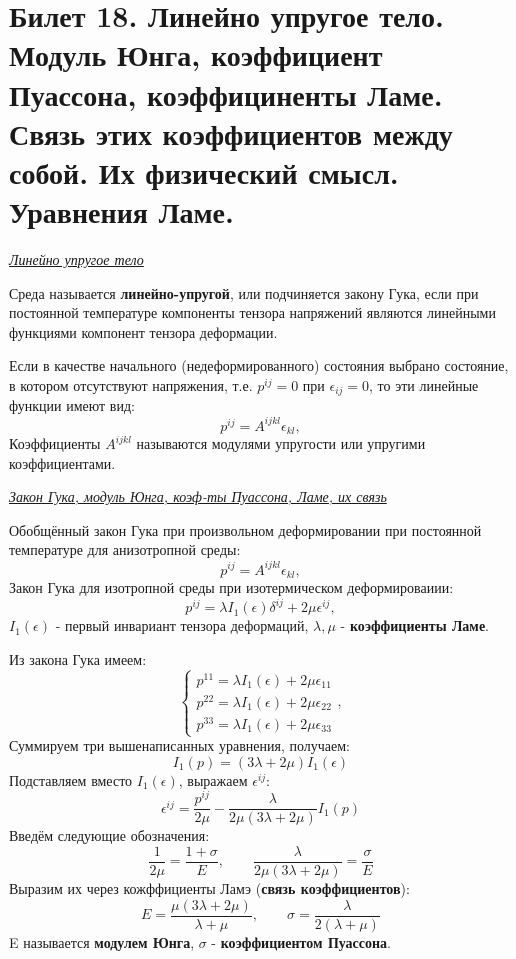 \newpage
\section{Билет 18. Линейно упругое тело. Модуль Юнга, коэффициент Пуассона, коэффициненты Ламе. Связь этих коэффициентов между собой. Их физический смысл. Уравнения Ламе.}

\begin{center}
  \textit{\underline{Линейно упругое тело}}
\end{center}
\quad[Э-137]Среда называется \textbf{линейно-упругой}, или подчиняется закону Гука, если при постоянной температуре компоненты тензора напряжений являются линейными функциями компонент тензора деформации.

\quad Если в качестве начального (недеформированного) состояния выбрано состояние, в котором отсутствуют напряжения, т.е. $p^{ij}=0$ при $\epsilon_{ij}=0$, то эти линейные функции имеют вид: $$p^{ij}=A^{ijkl}\epsilon_{kl},$$
Коэффициенты $A^{ijkl}$ называются модулями упругости или упругими коэффициентами.

\begin{center}
  \textit{\underline{Закон Гука, модуль Юнга, коэф-ты Пуассона, Ламе, их связь}}
\end{center}


\quad Обобщённый закон Гука при произвольном деформировании при постоянной температуре для анизотропной среды: $$p^{ij}=A^{ijkl}\epsilon_{kl},$$
\quad Закон Гука для изотропной среды при изотермическом деформироваиии: $$p^{ij} = \lambda I_1(\epsilon)\delta^{ij}+2\mu \epsilon^{ij},$$
$I_1(\epsilon)$ - первый инвариант тензора деформаций, $\lambda, \mu$ - \textbf{коэффициенты Ламе}.

Из закона Гука имеем:
$$ \begin{cases}
    p^{11} = \lambda I_1(\epsilon) + 2 \mu \epsilon_{11} \\
    p^{22} = \lambda I_1(\epsilon) + 2 \mu \epsilon_{22} \\
    p^{33} = \lambda I_1(\epsilon) + 2 \mu \epsilon_{33}
  \end{cases},$$
Суммируем три вышенаписанных уравнения, получаем: $$I_1(p) = (3\lambda + 2\mu)I_1(\epsilon)  $$
Подставляем вместо $I_1(\epsilon)$, выражаем $\epsilon^{ij}$: $$\epsilon^{ij} = \frac{p^{ij}}{2\mu} - \frac{\lambda}{2\mu (3\lambda + 2\mu)}I_1(p)$$
Введём следующие обозначения: $$\frac{1}{2\mu} = \frac{1+\sigma}{E}, \qquad \frac{\lambda}{2\mu (3\lambda + 2\mu)}=\frac{\sigma}{E}$$
Выразим их через кожффициенты Ламэ (\textbf{связь коэффициентов}): $$E = \frac{\mu(3\lambda + 2\mu)}{\lambda + \mu}, \qquad \sigma = \frac{\lambda}{2(\lambda + \mu)}$$
E называется \textbf{модулем Юнга}, $\sigma$ - \textbf{коэффициентом Пуассона}.



